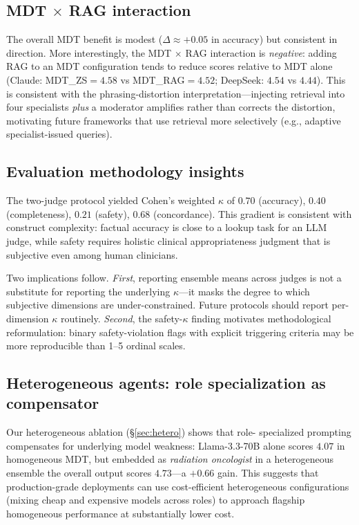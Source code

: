 \documentclass[final, 11pt, 3p]{elsarticle}
\begin{document}
\subsection{MDT $\times$ RAG interaction}
The overall MDT benefit is modest ($\Delta{\approx}+0.05$ in accuracy)
but consistent in direction. More interestingly, the MDT $\times$ RAG
interaction is \emph{negative}: adding RAG to an MDT configuration
tends to reduce scores relative to MDT alone (Claude: MDT\_ZS$=4.58$
vs MDT\_RAG$=4.52$; DeepSeek: $4.54$ vs $4.44$). This is consistent
with the phrasing-distortion interpretation---injecting retrieval into
four specialists \emph{plus} a moderator amplifies rather than
corrects the distortion, motivating future frameworks that use
retrieval more selectively (e.g., adaptive specialist-issued queries).

\subsection{Evaluation methodology insights}
The two-judge protocol yielded Cohen's weighted $\kappa$ of $0.70$
(accuracy), $0.40$ (completeness), $0.21$ (safety), $0.68$
(concordance). This gradient is consistent with construct complexity:
factual accuracy is close to a lookup task for an LLM judge, while
safety requires holistic clinical appropriateness judgment that is
subjective even among human clinicians.

Two implications follow. \emph{First}, reporting ensemble means across
judges is not a substitute for reporting the underlying $\kappa$---it
masks the degree to which subjective dimensions are under-constrained.
Future protocols should report per-dimension $\kappa$ routinely.
\emph{Second}, the safety-$\kappa$ finding motivates methodological
reformulation: binary safety-violation flags with explicit triggering
criteria may be more reproducible than 1--5 ordinal scales.

\subsection{Heterogeneous agents: role specialization as compensator}
Our heterogeneous ablation (\S\ref{sec:hetero}) shows that role-
specialized prompting compensates for underlying model weakness:
Llama-3.3-70B alone scores $4.07$ in homogeneous MDT, but embedded as
\emph{radiation oncologist} in a heterogeneous ensemble the overall
output scores $4.73$---a $+0.66$ gain. This suggests that
production-grade deployments can use cost-efficient heterogeneous
configurations (mixing cheap and expensive models across roles) to
approach flagship homogeneous performance at substantially lower cost.
\end{document}
